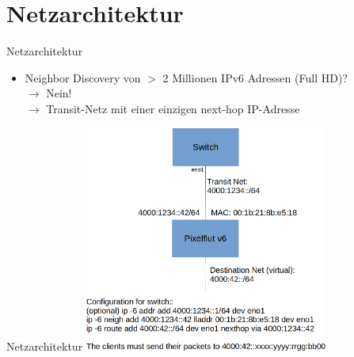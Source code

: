 \documentclass[12pt,donthandout,notes=dontshow,xcolor=table]{beamer}
\begin{document}
\section{Netzarchitektur}
\begin{frame}{Netzarchitektur}
	\begin{itemize}
		\item Neighbor Discovery von $>$ 2 Millionen IPv6 Adressen (Full HD)?\\
		\pause
		$\rightarrow$ Nein!\\
		\pause
		$\rightarrow$ Transit-Netz mit einer einzigen next-hop IP-Adresse
	\end{itemize}
\end{frame}

\begin{frame}{Netzarchitektur}
	\includegraphics[width=8cm]{figures/network_structure_cut}
\end{frame}
\end{document}
